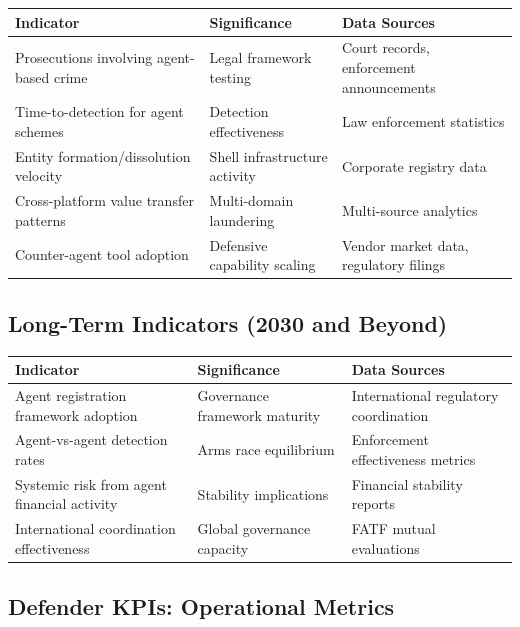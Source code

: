 \documentclass[11pt,letterpaper]{article}
\begin{document}
\begingroup\small
\begin{longtable}{L{0.320\dimexpr{}\tabcolsep\relax}L{0.360\dimexpr{}\tabcolsep\relax}L{0.320\dimexpr{}\tabcolsep\relax}}
\toprule
\textbf{Indicator} & \textbf{Significance} & \textbf{Data Sources} \\
\midrule
\endhead
Prosecutions involving agent-based crime & Legal framework testing & Court records, enforcement announcements \\
Time-to-detection for agent schemes & Detection effectiveness & Law enforcement statistics \\
Entity formation/dissolution velocity & Shell infrastructure activity & Corporate registry data \\
Cross-platform value transfer patterns & Multi-domain laundering & Multi-source analytics \\
Counter-agent tool adoption & Defensive capability scaling & Vendor market data, regulatory filings \\
\bottomrule
\end{longtable}
\endgroup

\subsection{Long-Term Indicators (2030 and Beyond)}

\begingroup\small
\begin{longtable}{L{0.360\dimexpr{}\tabcolsep\relax}L{0.320\dimexpr{}\tabcolsep\relax}L{0.320\dimexpr{}\tabcolsep\relax}}
\toprule
\textbf{Indicator} & \textbf{Significance} & \textbf{Data Sources} \\
\midrule
\endhead
Agent registration framework adoption & Governance framework maturity & International regulatory coordination \\
Agent-vs-agent detection rates & Arms race equilibrium & Enforcement effectiveness metrics \\
Systemic risk from agent financial activity & Stability implications & Financial stability reports \\
International coordination effectiveness & Global governance capacity & FATF mutual evaluations \\
\bottomrule
\end{longtable}
\endgroup

\subsection{Defender KPIs: Operational Metrics}
\end{document}
